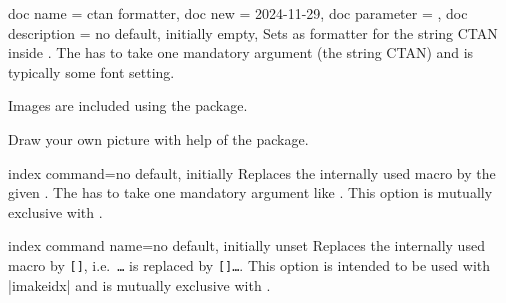 \begin{docTcbKeys}
  {
    {
      doc name        = ctan formatter,
      doc new         = {2024-11-29},
      doc parameter   = ,
      doc description = {no default, initially empty},
    }
  }
Sets  as formatter for the string CTAN inside .
The  has to take one mandatory argument (the string CTAN) and
is typically some font setting.
\begin{dispExample}
Images are included using the  package.\par
\newcommand{\myformatter}[1]{\textbf{\ttfamily\color{red}\TeX-Archive}}
Draw your own picture with help of the  package.
\end{dispExample}
\end{docTcbKeys}



\begin{docTcbKey}[][doc new=2015-01-09]{index command}{=}{no default, initially }
  Replaces the internally used  macro by the given .
  The  has to take one mandatory argument like .
  This option is mutually exclusive with .
\begin{dispListing}
\end{dispListing}
\end{docTcbKey}


\begin{docTcbKey}[][doc new=2015-01-09]{index command name}{=}{no default, initially unset}
  Replaces the internally used  macro by
  \mbox{\texttt{[]}}, i.e.\ 
  \mbox{\texttt{\textbraceleft\ldots\textbraceright}} is replaced by
  \mbox{\cs{index}\texttt{[\meta{name}]\textbraceleft\ldots\textbraceright}}.
  This option is intended to be used with |imakeidx| and is
  mutually exclusive with .
\begin{dispListing}
\end{dispListing}
\end{docTcbKey}

\clearpage

